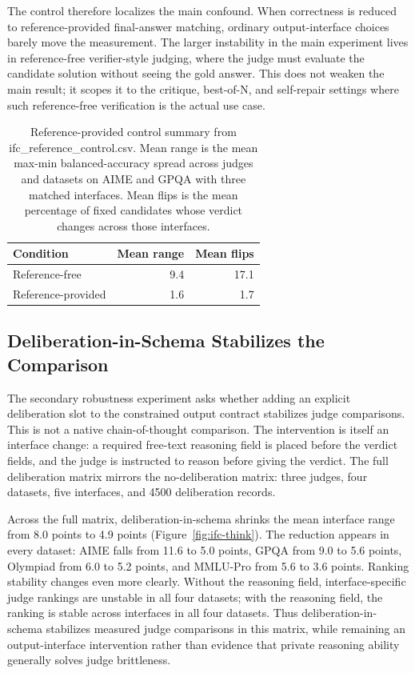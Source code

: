 \documentclass[journal]{IEEEtran}
\begin{document}
The control therefore localizes the main confound. When correctness is reduced to reference-provided final-answer matching, ordinary output-interface choices barely move the measurement. The larger instability in the main experiment lives in reference-free verifier-style judging, where the judge must evaluate the candidate solution without seeing the gold answer. This does not weaken the main result; it scopes it to the critique, best-of-N, and self-repair settings where such reference-free verification is the actual use case.

\begin{table}[t]
\centering
\footnotesize
\setlength{\tabcolsep}{4pt}
\begin{tabular}{lrr}
\toprule
Condition & Mean range & Mean flips \\
\midrule
Reference-free & 9.4 & 17.1 \\
Reference-provided & 1.6 & 1.7 \\
\bottomrule
\end{tabular}
\caption{Reference-provided control summary from ifc\_reference\_control.csv. Mean range is the mean max-min balanced-accuracy spread across judges and datasets on AIME and GPQA with three matched interfaces. Mean flips is the mean percentage of fixed candidates whose verdict changes across those interfaces.}
\label{tab:reference-control}
\end{table}

\subsection{Deliberation-in-Schema Stabilizes the Comparison}
\label{sec:results-deliberation}

The secondary robustness experiment asks whether adding an explicit deliberation slot to the constrained output contract stabilizes judge comparisons. This is not a native chain-of-thought comparison. The intervention is itself an interface change: a required free-text reasoning field is placed before the verdict fields, and the judge is instructed to reason before giving the verdict. The full deliberation matrix mirrors the no-deliberation matrix: three judges, four datasets, five interfaces, and 4500 deliberation records.

Across the full matrix, deliberation-in-schema shrinks the mean interface range from 8.0 points to 4.9 points (Figure~\ref{fig:ifc-think}). The reduction appears in every dataset: AIME falls from 11.6 to 5.0 points, GPQA from 9.0 to 5.6 points, Olympiad from 6.0 to 5.2 points, and MMLU-Pro from 5.6 to 3.6 points. Ranking stability changes even more clearly. Without the reasoning field, interface-specific judge rankings are unstable in all four datasets; with the reasoning field, the ranking is stable across interfaces in all four datasets. Thus deliberation-in-schema stabilizes measured judge comparisons in this matrix, while remaining an output-interface intervention rather than evidence that private reasoning ability generally solves judge brittleness.
\end{document}
